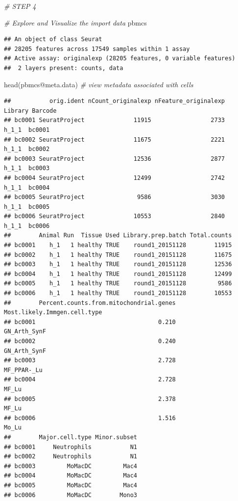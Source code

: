\documentclass[
]{article}
\newenvironment{Shaded}{\begin{snugshade}}{\end{snugshade}}
\newcommand{\CommentTok}[1]{\textcolor[rgb]{0.56,0.35,0.01}{\textit{#1}}}
\newcommand{\FunctionTok}[1]{\textcolor[rgb]{0.00,0.00,0.00}{#1}}
\newcommand{\NormalTok}[1]{#1}
\newcommand{\SpecialCharTok}[1]{\textcolor[rgb]{0.00,0.00,0.00}{#1}}
\begin{document}
\begin{Shaded}
\begin{Highlighting}[]
\CommentTok{\# STEP 4}

\CommentTok{\# Explore and Visualize the import data}
\NormalTok{pbmcs}
\end{Highlighting}
\end{Shaded}

\begin{verbatim}
## An object of class Seurat 
## 28205 features across 17549 samples within 1 assay 
## Active assay: originalexp (28205 features, 0 variable features)
##  2 layers present: counts, data
\end{verbatim}

\begin{Shaded}
\begin{Highlighting}[]
\FunctionTok{head}\NormalTok{(pbmcs}\SpecialCharTok{@}\NormalTok{meta.data) }\CommentTok{\# view metadata associated with cells}
\end{Highlighting}
\end{Shaded}

\begin{verbatim}
##           orig.ident nCount_originalexp nFeature_originalexp Library Barcode
## bc0001 SeuratProject              11915                 2733   h_1_1  bc0001
## bc0002 SeuratProject              11675                 2221   h_1_1  bc0002
## bc0003 SeuratProject              12536                 2877   h_1_1  bc0003
## bc0004 SeuratProject              12499                 2742   h_1_1  bc0004
## bc0005 SeuratProject               9586                 3030   h_1_1  bc0005
## bc0006 SeuratProject              10553                 2840   h_1_1  bc0006
##        Animal Run  Tissue Used Library.prep.batch Total.counts
## bc0001    h_1   1 healthy TRUE    round1_20151128        11915
## bc0002    h_1   1 healthy TRUE    round1_20151128        11675
## bc0003    h_1   1 healthy TRUE    round1_20151128        12536
## bc0004    h_1   1 healthy TRUE    round1_20151128        12499
## bc0005    h_1   1 healthy TRUE    round1_20151128         9586
## bc0006    h_1   1 healthy TRUE    round1_20151128        10553
##        Percent.counts.from.mitochondrial.genes Most.likely.Immgen.cell.type
## bc0001                                   0.210                 GN_Arth_SynF
## bc0002                                   0.240                 GN_Arth_SynF
## bc0003                                   2.728                  MF_PPAR-_Lu
## bc0004                                   2.728                        MF_Lu
## bc0005                                   2.378                        MF_Lu
## bc0006                                   1.516                        Mo_Lu
##        Major.cell.type Minor.subset
## bc0001     Neutrophils           N1
## bc0002     Neutrophils           N1
## bc0003         MoMacDC         Mac4
## bc0004         MoMacDC         Mac4
## bc0005         MoMacDC         Mac4
## bc0006         MoMacDC        Mono3
\end{verbatim}
\end{document}
